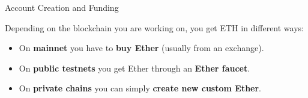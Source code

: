 \documentclass[]{beamer}
\begin{document}



\begin{frame}{Account Creation and Funding}
	
	Depending on the blockchain you are working on, you get ETH in different ways:\\
	
	\begin{itemize}
		\item<1-> On \textbf{mainnet} you have to \textbf{buy Ether}	 (usually from an exchange).
		\item<2-> On \textbf{public testnets} you get Ether through an \textbf{Ether faucet}.
		\item<3-> On \textbf{private chains} you can simply \textbf{create new custom Ether}.
	\end{itemize}
	\vspace{1em}
\end{frame}


\end{document}

